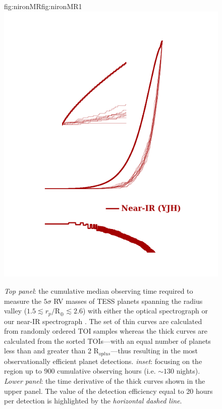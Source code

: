 \begin{figure}
  \begin{ocg}{fig:nironMR}{fig:nironMR}{1}%
  \includegraphics[width=0.6\hsize]{figures/cumulativetobsGP_radvalley_nir.png}%
  \end{ocg}
  \hspace{-0.6\hsize}%
  \caption[Cumulative mean observing times to measure RV masses of TOI planets spanning the radius valley.]
          {\small \emph{Top panel}: the cumulative median observing time required to measure the $5\sigma$
    RV masses of
    TESS planets spanning the radius valley ($1.5 \lesssim r_p/\text{R}_{\oplus} \lesssim 2.6$)
    with either the optical spectrograph
     or our
    near-IR spectrograph 
    . The set of 
    thin curves are calculated from randomly ordered TOI samples whereas the thick curves are
    calculated from the sorted TOIs---with an equal number of planets less than and greater than
    2 R$_{oplus}$---thus resulting in the most observationally efficient planet
    detections. \emph{inset}: focusing on the region up to $900$ cumulative observing hours (i.e.
    $\sim 130$ nights). \emph{Lower panel}: the time derivative of the thick curves shown in the upper panel.
    The value of the detection efficiency equal to 20 hours per detection is highlighted
    by the \emph{horizontal dashed line}.}
  \label{RVFCfig:cumulativeMR}
\end{figure}


